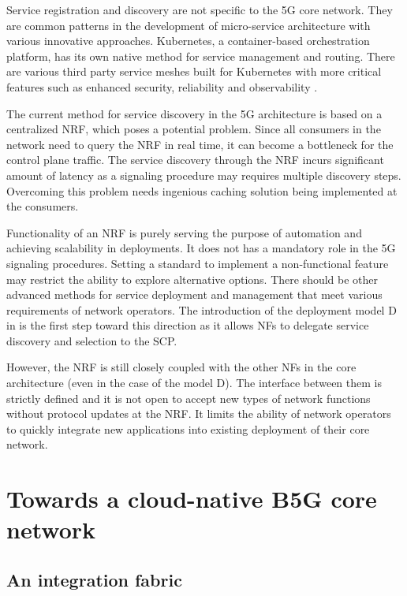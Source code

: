 \documentclass[conference]{IEEEtran}
\begin{document}
Service registration and discovery are not specific to the 5G core network.
They are common patterns in the development of micro-service architecture with
various innovative approaches. Kubernetes, a container-based orchestration
platform, has its own native method for service management and routing. There
are various third party service meshes built for Kubernetes with more critical
features such as enhanced security, reliability and observability \cite{mesh}.

The current method for service discovery in the 5G architecture is based on a
centralized NRF, which poses a potential problem. Since all consumers in the
network need to query the NRF in real time, it can become a bottleneck for the
control plane traffic. The service discovery through the NRF incurs significant
amount of latency as a signaling procedure may requires multiple discovery
steps. Overcoming this problem needs ingenious caching solution being implemented
at the consumers.


Functionality of an NRF is purely serving the purpose of automation and
achieving scalability in deployments. It does not has a mandatory role in the
5G signaling procedures.  Setting a standard to implement a non-functional
feature may restrict the ability to explore alternative options. There should
be other advanced methods for service deployment and management that meet
various requirements of network operators. The introduction of the deployment
model D in \cite{rel16}  is the first step toward this direction as it allows
NFs to delegate service discovery and selection to the SCP.

However, the NRF is still closely coupled with the other NFs in the core
architecture (even in the case of the model D). The interface between them is
strictly defined and it is not open to accept new types of network functions
without protocol updates at the NRF. It limits the ability of network operators to
quickly integrate new applications into existing deployment of their core
network.

\section{Towards a cloud-native B5G core network \label{sec:arch}}


\subsection{An integration fabric}
\end{document}
